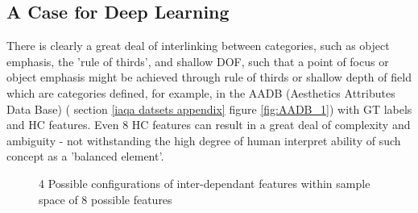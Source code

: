 \subsection{A Case for Deep Learning}
\label{sec:a case for dl}

There is clearly a great deal of interlinking between categories, such as object emphasis, the 'rule of thirds', and shallow DOF, such that a point of focus or object emphasis might be achieved through rule of thirds or shallow depth of field which are categories defined, for example, in the AADB (Aesthetics Attributes Data Base) ( section \ref{iaqa datsets appendix} figure \ref{fig:AADB_1})  with GT labels and HC features. Even 8 HC features can result in a great deal of complexity and ambiguity - not withstanding the high degree of human interpret ability of such concept as a 'balanced element'.

\begin{figure}[ht!]
\specialrule{0.01em}{0.2em}{0.2em}
\centering

\hspace{1mm}

\caption{\label{fig:AADB_Venn}4 Possible configurations of inter-dependant features within sample space of 8 possible features}
\label{fig:AADB_Venn_}
\specialrule{0.01em}{0.2em}{0.2em}
\end{figure}

